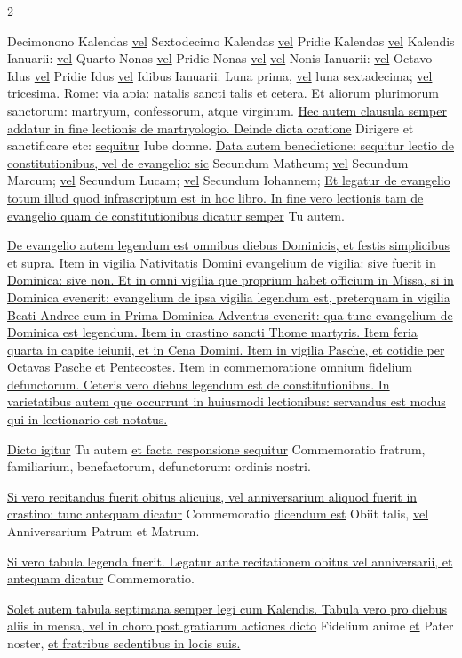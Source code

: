 \documentclass[11pt,openany]{book}
\renewcommand{\\}{\par\hspace*{1em}} %
\renewcommand{\newline}{\par \noindent}
\begin{document}
\begin{multicols*}{2}
\newline Decimonono Kalendas \ul{vel} Sextodecimo Kalendas \ul{vel} Pridie Kalendas \ul{vel} Kalendis Ianuarii: \ul{vel} Quarto Nonas \ul{vel} Pridie Nonas \ul{vel}  \ul{vel} Nonis Ianuarii: \ul{vel} Octavo Idus \ul{vel} Pridie Idus \ul{vel} Idibus Ianuarii: Luna prima, \ul{vel} luna sextadecima; \ul{vel} tricesima. Rome: via apia: natalis sancti talis et cetera. Et aliorum plurimorum sanctorum: martryum, confessorum, atque virginum. \ul{Hec autem clausula semper addatur in fine lectionis de martryologio. Deinde dicta oratione} Dirigere et sanctificare etc: \ul{sequitur} Iube domne. \ul{Data autem benedictione: sequitur lectio de constitutionibus, vel de evangelio: sic} Secundum Matheum; \ul{vel} Secundum Marcum; \ul{vel} Secundum Lucam; \ul{vel} Secundum Iohannem; \ul{Et legatur de evangelio totum illud quod infrascriptum est in hoc libro. In fine vero lectionis tam de evangelio quam de constitutionibus dicatur semper} Tu autem.
\newline \ul{De evangelio autem legendum est omnibus diebus Dominicis, et festis simplicibus et supra. Item in vigilia Nativitatis Domini evangelium de vigilia: sive fuerit in Dominica: sive non. Et in omni vigilia que proprium habet officium in Missa, si in Dominica evenerit: evangelium de ipsa vigilia legendum est, preterquam in vigilia Beati Andree cum in Prima Dominica Adventus evenerit: qua tunc evangelium de Dominica est legendum. Item in crastino sancti Thome martyris. Item feria quarta in capite ieiunii, et in Cena Domini. Item in vigilia Pasche, et cotidie per Octavas Pasche et Pentecostes. Item in commemoratione omnium fidelium defunctorum. Ceteris vero diebus legendum est de constitutionibus. In varietatibus autem que occurrunt in huiusmodi lectionibus: servandus est modus qui in lectionario est notatus.}
\newline \ul{Dicto igitur} Tu autem \ul{et facta responsione sequitur} Commemoratio fratrum, familiarium, benefactorum, defunctorum: ordinis nostri.
\newline \ul{Si vero recitandus fuerit obitus alicuius, vel anniversarium aliquod fuerit in crastino: tunc antequam dicatur} Commemoratio \ul{dicendum est} Obiit talis, \ul{vel} Anniversarium Patrum et Matrum.
\newline \ul{Si vero tabula legenda fuerit. Legatur ante recitationem obitus vel anniversarii, et antequam dicatur} Commemoratio.
\newline \ul{Solet autem tabula septimana semper legi cum Kalendis. Tabula vero pro diebus aliis in mensa, vel in choro post gratiarum actiones dicto} Fidelium anime \ul{et} Pater noster, \ul{et fratribus sedentibus in locis suis.} 

\end{multicols*}
\end{document}

